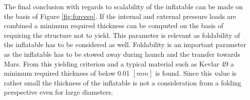 The final conclusion with regards to scalability of the inflatable can be made on the basis of Figure \ref{fig:forcesp}. If the internal and external pressure loads are combined a minimum required thickness can be computed on the basis of requiring the structure not to yield. This parameter is relevant as foldability of the inflatable has to be considered as well. Foldability is an important parameter as the inflatable has to be stowed away during launch and the transfer towards Mars. From this yielding criterion and a typical material such as Kevlar 49 a minimum required thickness of below 0.01 $[mm]$ is found. Since this value is rather small the thickness of the inflatable is not a consideration from a folding perspective even for large diameters.
